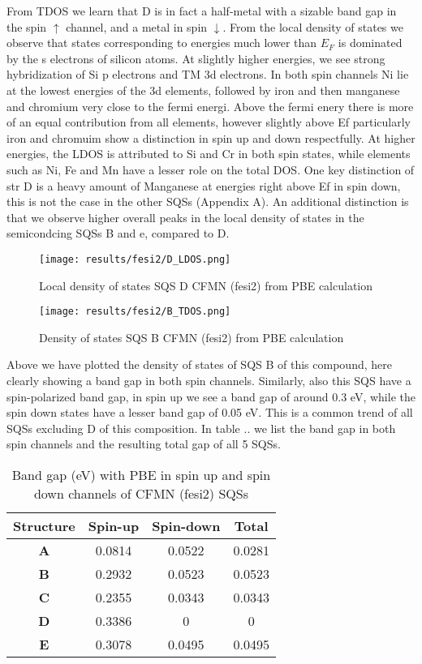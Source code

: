 From TDOS we learn that D is in fact a half-metal with a sizable band gap in the spin $\uparrow$ channel, and a metal in spin $\downarrow$. From the local density of states we observe that states corresponding to energies much lower than $E_F$ is dominated by the s electrons of silicon atoms. At slightly higher energies, we see strong hybridization of Si p electrons and TM 3d electrons. In both spin channels Ni lie at the lowest energies of the 3d elements, followed by iron and then manganese and chromium very close to the fermi energi. Above the fermi enery there is more of an equal contribution from all elements, however slightly above Ef particularly iron and chromuim show a distinction in spin up and down respectfully.  At higher energies, the LDOS is attributed to Si and Cr in both spin states, while elements such as Ni, Fe and Mn have  a lesser role on the total DOS. One key distinction of str D is a heavy amount of Manganese at energies right above Ef in spin down, this is not the case in the other SQSs (Appendix A). An additional distinction is that we observe higher overall peaks in the local density of states in the semicondcing SQSs B and e, compared to D. 

\begin{figure}[H]
	\texttt{[image: results/fesi2/D\_LDOS.png]}
	\caption{Local density of states SQS D CFMN (fesi2) from PBE calculation}
\end{figure}

\begin{figure}[H]
	\texttt{[image: results/fesi2/B\_TDOS.png]}
	\caption{Density of states SQS B CFMN (fesi2) from PBE calculation}
\end{figure}

Above we have plotted the density of states of SQS B of this compound, here clearly showing a band gap in both spin channels. Similarly, also this SQS have a spin-polarized band gap, in spin up we see a band gap of around 0.3 eV, while the spin down states have a lesser band gap of 0.05 eV. This is a common trend of all SQSs excluding D of this composition. In table .. we list the band gap in both spin channels and the resulting total gap of all 5 SQSs. 

\begin{table}[H]
\centering
\begin{tabular}{@{}cccc@{}}
\toprule
Structure  & Spin-up & Spin-down & Total  \\ \midrule
\textbf{A} & 0.0814  & 0.0522    & 0.0281 \\
\textbf{B} & 0.2932  & 0.0523    & 0.0523 \\
\textbf{C} & 0.2355  & 0.0343    & 0.0343 \\
\textbf{D} & 0.3386  & 0         & 0      \\
\textbf{E} & 0.3078  & 0.0495    & 0.0495 \\ \bottomrule
\end{tabular}
\caption{Band gap (eV) with PBE in spin up and spin down channels of CFMN (fesi2) SQSs}
\end{table}

